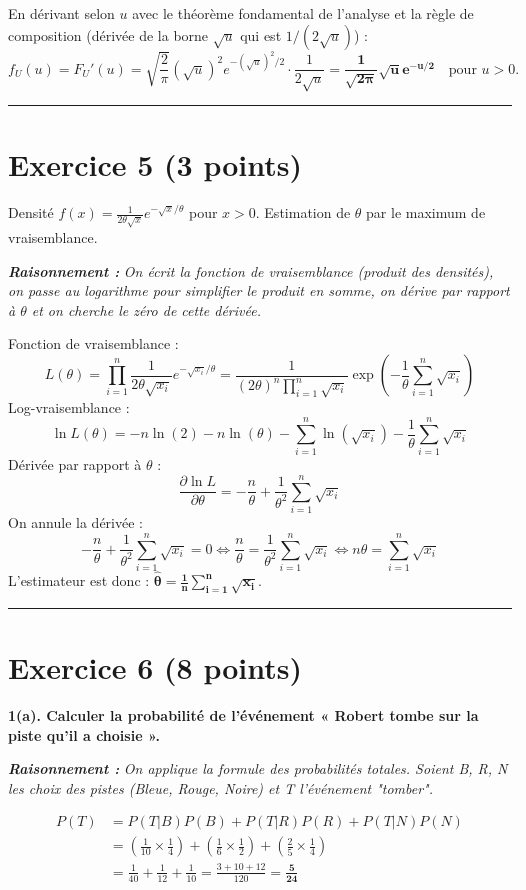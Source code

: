 \documentclass[11pt,a4paper]{article}
\newcommand{\raisonnement}[1]{
    \vspace{0.2cm}
    \noindent\textcolor{blue!80!black}{
        \textbf{\textit{Raisonnement : }} \textit{#1}
    }
    \vspace{0.2cm}
}
\begin{document}
En dérivant selon $u$ avec le théorème fondamental de l'analyse et la règle de composition (dérivée de la borne $\sqrt{u}$ qui est $1/(2\sqrt{u})$) :
$$ f_U(u) = F_U'(u) = \sqrt{\frac{2}{\pi}} (\sqrt{u})^2 e^{-(\sqrt{u})^2/2} \cdot \frac{1}{2\sqrt{u}} = \mathbf{\frac{1}{\sqrt{2\pi}} \sqrt{u} e^{-u/2}} \quad \text{pour } u>0. $$

\vspace{0.5cm}
\hrule
\vspace{0.5cm}

\section*{Exercice 5 (3 points)}

Densité $f(x) = \frac{1}{2\theta\sqrt{x}} e^{-\sqrt{x}/\theta}$ pour $x>0$.
Estimation de $\theta$ par le maximum de vraisemblance.

\raisonnement{On écrit la fonction de vraisemblance (produit des densités), on passe au logarithme pour simplifier le produit en somme, on dérive par rapport à $\theta$ et on cherche le zéro de cette dérivée.}
Fonction de vraisemblance :
$$ L(\theta) = \prod_{i=1}^n \frac{1}{2\theta\sqrt{x_i}} e^{-\sqrt{x_i}/\theta} = \frac{1}{(2\theta)^n \prod_{i=1}^n \sqrt{x_i}} \exp\left(-\frac{1}{\theta}\sum_{i=1}^n \sqrt{x_i}\right) $$
Log-vraisemblance :
$$ \ln L(\theta) = -n\ln(2) - n\ln(\theta) - \sum_{i=1}^n \ln(\sqrt{x_i}) - \frac{1}{\theta} \sum_{i=1}^n \sqrt{x_i} $$
Dérivée par rapport à $\theta$ :
$$ \frac{\partial \ln L}{\partial \theta} = -\frac{n}{\theta} + \frac{1}{\theta^2} \sum_{i=1}^n \sqrt{x_i} $$
On annule la dérivée :
$$ -\frac{n}{\theta} + \frac{1}{\theta^2} \sum_{i=1}^n \sqrt{x_i} = 0 \iff \frac{n}{\theta} = \frac{1}{\theta^2} \sum_{i=1}^n \sqrt{x_i} \iff n\theta = \sum_{i=1}^n \sqrt{x_i} $$
L'estimateur est donc : $\mathbf{\hat{\theta} = \frac{1}{n} \sum_{i=1}^n \sqrt{x_i}}$.

\vspace{0.5cm}
\hrule
\vspace{0.5cm}

\section*{Exercice 6 (8 points)}

\textbf{1(a). Calculer la probabilité de l'événement « Robert tombe sur la piste qu'il a choisie ».}
\raisonnement{On applique la formule des probabilités totales. Soient B, R, N les choix des pistes (Bleue, Rouge, Noire) et T l'événement "tomber".}
\begin{align*}
P(T) &= P(T|B)P(B) + P(T|R)P(R) + P(T|N)P(N) \\
&= \left(\frac{1}{10} \times \frac{1}{4}\right) + \left(\frac{1}{6} \times \frac{1}{2}\right) + \left(\frac{2}{5} \times \frac{1}{4}\right) \\
&= \frac{1}{40} + \frac{1}{12} + \frac{1}{10} = \frac{3 + 10 + 12}{120} = \mathbf{\frac{5}{24}}
\end{align*}
\end{document}

